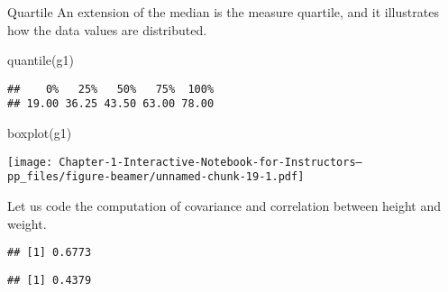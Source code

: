 \documentclass[
  ignorenonframetext,
]{beamer}
\newenvironment{Shaded}{\begin{snugshade}}{\end{snugshade}}
\newcommand{\FunctionTok}[1]{\textcolor[rgb]{0.00,0.00,0.00}{#1}}
\newcommand{\NormalTok}[1]{#1}
\newcommand{\SpecialCharTok}[1]{\textcolor[rgb]{0.00,0.00,0.00}{#1}}
\begin{document}
\begin{frame}[fragile]{Quartile}
\protect\hypertarget{quartile}{}
An extension of the median is the measure quartile, and it illustrates
how the data values are distributed.

\begin{Shaded}
\begin{Highlighting}[]
\FunctionTok{quantile}\NormalTok{(g1) }
\end{Highlighting}
\end{Shaded}

\begin{verbatim}
##    0%   25%   50%   75%  100% 
## 19.00 36.25 43.50 63.00 78.00
\end{verbatim}

\begin{Shaded}
\begin{Highlighting}[]
\FunctionTok{boxplot}\NormalTok{(g1)}
\end{Highlighting}
\end{Shaded}

\texttt{[image: Chapter-1-Interactive-Notebook-for-Instructors---pp\_files/figure-beamer/unnamed-chunk-19-1.pdf]}
\end{frame}

\begin{frame}[fragile]
Let us code the computation of covariance and correlation between height
and weight.

\begin{Shaded}
\end{Shaded}

\begin{verbatim}
## [1] 0.6773
\end{verbatim}

\begin{Shaded}
\end{Shaded}

\begin{verbatim}
## [1] 0.4379
\end{verbatim}
\end{frame}
\end{document}
